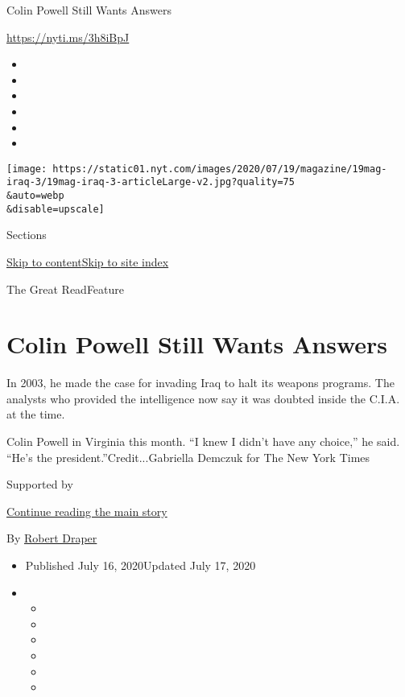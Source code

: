 Colin Powell Still Wants Answers

\href{https://nyti.ms/3h8iBpJ}{https://nyti.ms/3h8iBpJ}

\begin{itemize}
\item
\item
\item
\item
\item
\item
\end{itemize}

\texttt{[image: https://static01.nyt.com/images/2020/07/19/magazine/19mag-iraq-3/19mag-iraq-3-articleLarge-v2.jpg?quality=75\\\&auto=webp\\\&disable=upscale]}

Sections

\protect\hyperlink{site-content}{Skip to
content}\protect\hyperlink{site-index}{Skip to site index}

The Great ReadFeature

\hypertarget{colin-powell-still-wants-answers}{%
\section{Colin Powell Still Wants
Answers}\label{colin-powell-still-wants-answers}}

In 2003, he made the case for invading Iraq to halt its weapons
programs. The analysts who provided the intelligence now say it was
doubted inside the C.I.A. at the time.

Colin Powell in Virginia this month. ``I knew I didn't have any
choice,'' he said. ``He's the president.''Credit...Gabriella Demczuk for
The New York Times

Supported by

\protect\hyperlink{after-sponsor}{Continue reading the main story}

By \href{https://www.nytimes.com/by/robert-draper}{Robert Draper}

\begin{itemize}
\item
  Published July 16, 2020Updated July 17, 2020
\item
  \begin{itemize}
  \item
  \item
  \item
  \item
  \item
  \item
  \end{itemize}
\end{itemize}

